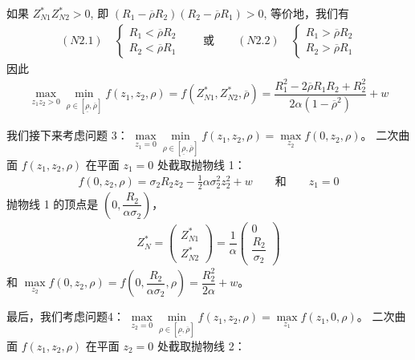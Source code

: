 \documentclass[10.0pt]{article}
\begin{document}
如果 $ Z_{N 1}^* Z_{N 2}^* > 0 $, 即 $ (R_1 - \overline{\rho} R_2) (R_2 - \overline{\rho} R_1) > 0 $, 等价地，我们有
\begin{eqnarray}
(N2.1) \quad \left\{ \begin{matrix} R_1 < \overline{\rho} R_2 \\ R_2 < \overline{\rho} R_1 \end{matrix} \right. \qquad \text{或} \qquad (N2.2) \quad \left\{ \begin{matrix} R_1 > \overline{\rho} R_2 \\ R_2 > \overline{\rho} R_1 \end{matrix} \right.
\end{eqnarray}
因此
\begin{eqnarray*}
\max\limits_{z_1 z_2 > 0} \min\limits_{\rho \in [\underline{\rho}, \overline{\rho}]} f (z_1, z_2, \rho) = f (Z_{N 1}^*, Z_{N 2}^*, \overline{\rho}) = \dfrac{R_1^2 - 2 \overline{\rho} R_1 R_2 + R_2^2}{2 \alpha (1 - \overline{\rho}^2)} + w
\end{eqnarray*}

我们接下来考虑问题 3： $ \max\limits_{z_1 = 0} \min\limits_{\rho \in [\underline{\rho}, \overline{\rho}]} f (z_1, z_2, \rho) = \max\limits_{z_2} f (0, z_2, \rho) $。
二次曲面 $ f (z_1, z_2, \rho) $ 在平面 $ z_1 = 0 $ 处截取抛物线 1：
\begin{eqnarray*}
f (0, z_2, \rho) = \sigma_2 R_2 z_2 - \frac12 \alpha \sigma_2^2 z_2^2 + w \qquad \text{和} \qquad z_1 = 0
\end{eqnarray*}
抛物线 1 的顶点是 $ \left( 0, \dfrac{R_2}{\alpha \sigma_2} \right) $，
\begin{eqnarray}
Z_N^* = \left( \begin{matrix} Z_{N 1}^* \\ Z_{N 2}^* \end{matrix} \right) = \dfrac1{\alpha} \left( \begin{matrix} 0 \\ \dfrac{R_2}{\sigma_2} \end{matrix} \right)
\end{eqnarray}
和 $ \max\limits_{z_2} f (0, z_2, \rho) = f \left( 0, \dfrac{R_2}{\alpha \sigma_2}, \rho \right) = \dfrac{R_2^2} {2 \alpha} + w $。

最后，我们考虑问题4： $ \max\limits_{z_2 = 0} \min\limits_{\rho \in [\underline{\rho}, \overline{\rho}]} f (z_1, z_2, \rho ) = \max\limits_{z_1} f (z_1, 0, \rho) $。
二次曲面 $ f (z_1, z_2, \rho) $ 在平面 $ z_2 = 0 $ 处截取抛物线 2：
\end{document}
